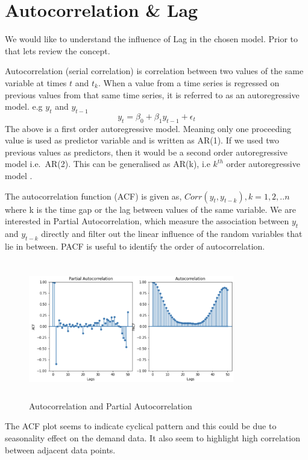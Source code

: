 \documentclass[mstat,12pt]{unswthesis}
\begin{document}
\section{Autocorrelation \& Lag}\label{autocorrelation-lag}

We would like to understand the influence of Lag in the chosen model.
Prior to that lets review the concept.

Autocorrelation (serial correlation) is correlation between two values
of the same variable at times \(t\) and \(t_k\). When a value from a
time series is regressed on previous values from that same time series,
it is referred to as an autoregressive model. e.g \(y_t\) and
\(y_{t-1}\) \[ 
y_t = \beta_0 + \beta_1 y_{t-1} + \epsilon_t
\] The above is a first order autoregressive model. Meaning only one
proceeding value is used as predictor variable and is written as AR(1).
If we used two previous values as predictors, then it would be a second
order autoregressive model i.e.~AR(2). This can be generalised as AR(k),
i.e \(k^{th}\) order autoregressive model
\cite{thepennsylvaniastateuniversity_102}.

The autocorrelation function (ACF) is given as,
\(Corr(y_t,y_{t-k}),k=1,2,..n\) \cite{nist_2020_13512} where k is the
time gap or the lag between values of the same variable. We are
interested in Partial Autocorrelation, which measure the association
between \(y_t\) and \(y_{t-k}\) directly and filter out the linear
influence of the random variables that lie in between. PACF is useful to
identify the order of autocorrelation.

\begin{figure}[H]
\centering
\includegraphics[width=0.80\textwidth,height=6cm]{autocorrelation.png}
\caption{Autocorrelation and Partial Autocorrelation}
\label{autocorrelation}
\end{figure}

The ACF plot seems to indicate cyclical pattern and this could be due to
seasonality effect on the demand data. It also seem to highlight high
correlation between adjacent data points.
\end{document}
